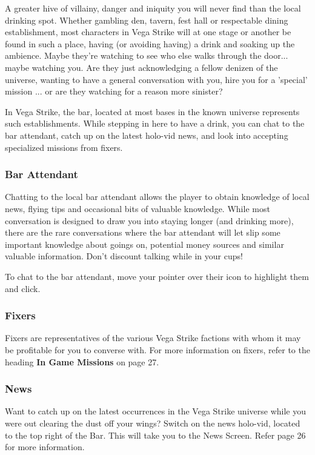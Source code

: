 \documentclass{article}
\begin{document}
A greater hive of villainy, danger and iniquity you will never find than the local drinking spot. Whether gambling den, tavern, fest hall or respectable dining establishment, most characters in Vega Strike will at one stage or another be found in such a place, having (or avoiding having) a drink and soaking up the ambience. Maybe they're watching to see who else walks through the door... maybe watching you. Are they just acknowledging a fellow denizen of the universe, wanting to have a general conversation with you, hire you for a 'special' mission ... or are they watching for a reason more sinister? 

In Vega Strike, the bar, located at most bases in the known universe represents such establishments. While stepping in here to have a drink, you can chat to the bar attendant, catch up on the latest holo-vid news, and look into accepting specialized missions from fixers. 

\subsubsection{ Bar Attendant }

Chatting to the local bar attendant allows the player to obtain knowledge of local news, flying tips and occasional bits of valuable knowledge. While most conversation is designed to draw you into staying longer (and drinking more), there are the rare conversations where the bar attendant will let slip some important knowledge about goings on, potential money sources and similar valuable information. Don't discount talking while in your cups! 

To chat to the bar attendant, move your pointer over their icon to highlight them and click. 

\subsubsection{ Fixers }

Fixers are representatives of the various Vega Strike factions with whom it may be profitable for you to converse with. For more information on fixers, refer to the heading \textbf{In Game Missions} on page 27. 

\subsubsection{ News }

Want to catch up on the latest occurrences in the Vega Strike universe while you were out clearing the dust off your wings? Switch on the news holo-vid, located to the top right of the Bar. This will take you to the News Screen. Refer page 26 for more information. 
\end{document}

